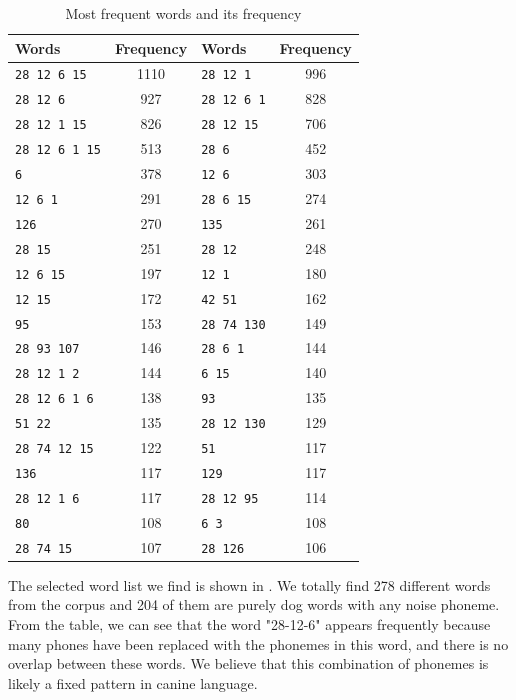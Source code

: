 \begin{table}[th]
\centering
\small
\begin{tabular}{lclc}
\hline
\textbf{Words} & \textbf{Frequency} & \textbf{Words} & \textbf{Frequency}\\
\hline
\verb|28 12 6 15| & 1110 & \verb|28 12 1| & 996 \\
\verb|28 12 6| & 927 & \verb|28 12 6 1| & 828 \\
\verb|28 12 1 15| & 826 & \verb|28 12 15| & 706 \\
\verb|28 12 6 1 15| & 513 & \verb|28 6| & 452 \\
\verb|6| & 378 & \verb|12 6| & 303 \\
\verb|12 6 1| & 291 & \verb|28 6 15| & 274 \\
\verb|126| & 270 & \verb|135| & 261 \\
\verb|28 15| & 251 & \verb|28 12| & 248 \\
\verb|12 6 15| & 197 & \verb|12 1| & 180 \\
\verb|12 15| & 172 & \verb|42 51| & 162 \\
\verb|95| & 153 & \verb|28 74 130| & 149 \\
\verb|28 93 107| & 146 & \verb|28 6 1| & 144 \\
\verb|28 12 1 2| & 144 & \verb|6 15| & 140 \\
\verb|28 12 6 1 6| & 138 & \verb|93| & 135 \\
\verb|51 22| & 135 & \verb|28 12 130| & 129 \\
\verb|28 74 12 15| & 122 & \verb|51| & 117 \\
\verb|136| & 117 & \verb|129| & 117 \\
\verb|28 12 1 6| & 117 & \verb|28 12 95| & 114 \\
\verb|80| & 108 & \verb|6 3| & 108 \\
\verb|28 74 15| & 107 & \verb|28 126| & 106 \\\hline
\end{tabular}
\caption{Most frequent words and its frequency}
\label{tab:mfw}
\end{table}

The selected word list we find is shown in . We totally find 278 different words from the corpus and 204 of them are purely dog words with any noise phoneme. From the table, we can see that the word "28-12-6" appears frequently because many phones have been replaced with the phonemes in this word, and there is no overlap between these words. We believe that this combination of phonemes is likely a fixed pattern in canine language.

